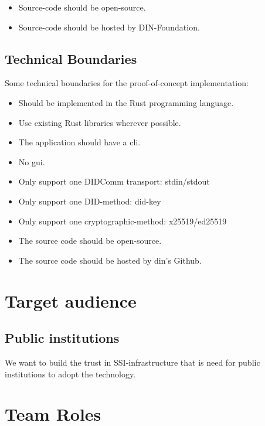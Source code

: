 \begin{itemize}
    \item Source-code should be open-source.
    \item Source-code should be hosted by DIN-Foundation.
\end{itemize}




\subsection{Technical Boundaries}
Some technical boundaries for the proof-of-concept implementation:

\begin{itemize}
    \item Should be implemented in the Rust programming language.
    \item Use existing Rust libraries wherever possible.
    \item The application should have a \acrfull{cli}.
    \item No \acrfull{gui}.
    \item Only support one DIDComm transport: \acrshort{stdin}/\acrshort{stdout}
    \item Only support one DID-method: \gls{did-key}
    \item Only support one cryptographic-method: x25519/ed25519
    \item The source code should be open-source.
    \item The source code should be hosted by \acrshort{din}'s Github.
\end{itemize}



\section{Target audience}

\subsection{Public institutions}

We want to build the trust in SSI-infrastructure that is need for public institutions to adopt the technology.


\newpage

\section{Team Roles}

